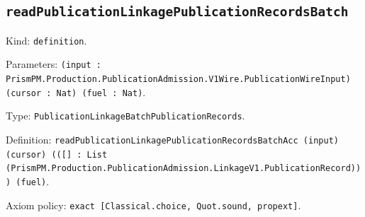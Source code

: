 \documentclass[11pt]{article}
\begin{document}
\subsection*{\texttt{readPublicationLinkagePublicationRecordsBatch}}
\noindent Kind: \texttt{definition}.\par
\noindent Parameters: \texttt{(input : PrismPM.Production.PublicationAdmission.V1Wire.PublicationWireInput) (cursor : Nat) (fuel : Nat)}.\par
\noindent Type: \texttt{PublicationLinkageBatchPublicationRecords}.\par
\noindent Definition: \texttt{readPublicationLinkagePublicationRecordsBatchAcc (input) (cursor) (([] : List (PrismPM.Production.PublicationAdmission.LinkageV1.PublicationRecord))) (fuel)}.\par
\noindent Axiom policy: \texttt{exact [Classical.choice, Quot.sound, propext]}.\par
\end{document}
